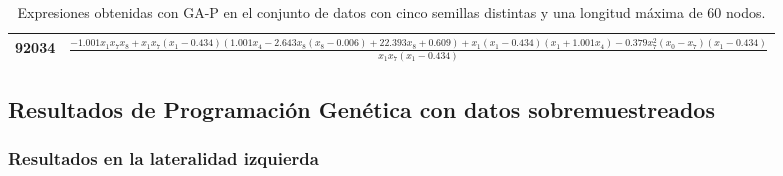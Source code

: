 \begin{table}[H]
{\begin{tabular}{|c|c|}
92034            & $\frac{- 1.001 x_{1} x_{7} x_{8} + x_{1} x_{7} \left(x_{1} - 0.434\right) \left(1.001 x_{4} - 2.643 x_{8} \left(x_{8} - 0.006\right) + 22.393 x_{8} + 0.609\right) + x_{1} \left(x_{1} - 0.434\right) \left(x_{1} + 1.001 x_{4}\right) - 0.379 x_{7}^{2} \left(x_{0} - x_{7}\right) \left(x_{1} - 0.434\right)}{x_{1} x_{7} \left(x_{1} - 0.434\right)}$                      \\ \hline
\end{tabular}%
}
\caption{Expresiones obtenidas con GA-P en el conjunto de datos con cinco semillas distintas y una longitud máxima de 60 nodos.}\label{table:exp_GAP_c_60}

\end{table}



\subsection{Resultados de Programación Genética con datos sobremuestreados}

\subsubsection{Resultados en la lateralidad izquierda}


\begin{table}[H]
\centering
{}
\caption{Resultados de Programación Genética en la lateralidad izquierda tras aplicar sobremuestreo, con cinco semillas distintas y una longitud máxima de 20 nodos.}\label{table:resultados_PG_over_l0_20}
\end{table}


